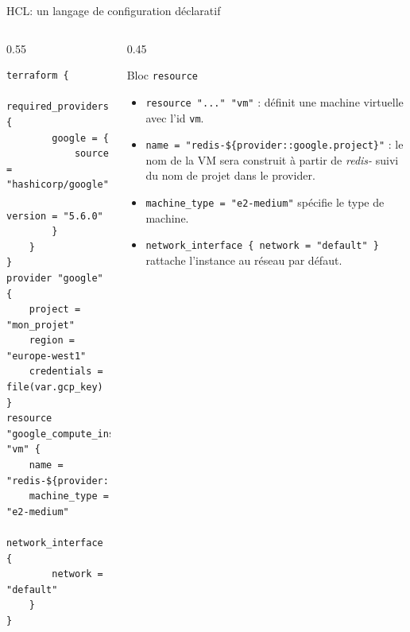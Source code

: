 \documentclass[aspectratio=169,10pt]{beamer}
\begin{document}
\begin{frame}[fragile]{HCL: un langage de configuration déclaratif}

\begin{columns}[T]
  \begin{column}{0.55\textwidth}
    \begin{lstlisting}[language=HCL, basicstyle=\ttfamily\scriptsize]
terraform {
    required_providers {
        google = {
            source  = "hashicorp/google"   
            version = "5.6.0"
        }
    }
}
provider "google" {
    project = "mon_projet"
    region = "europe-west1"
    credentials = file(var.gcp_key)
}
resource "google_compute_instance" "vm" {
    name = "redis-${provider::google.project}"
    machine_type = "e2-medium"
    network_interface {
        network = "default"
    }
}
\end{lstlisting}
  \end{column}

  \begin{column}{0.45\textwidth}
    \begin{block}{Bloc \lstinline[language=HCL]!resource!}
\begin{itemize}
  \item \lstinline[language=HCL]!resource "..." "vm"! : définit une machine virtuelle avec l'id \lstinline[language=HCL]!vm!.
  \item \lstinline[language=HCL]!name = "redis-${provider::google.project}"! : le nom de la VM sera construit à partir de \emph{redis-} suivi du nom de projet dans le provider.
  \item \lstinline[language=HCL]!machine_type = "e2-medium"! spécifie le type de machine.
  \item \lstinline[language=HCL]!network_interface { network = "default" }!  rattache l’instance au réseau par défaut.
\end{itemize}
    \end{block}
  \end{column}
\end{columns}
\end{frame}
\end{document}
